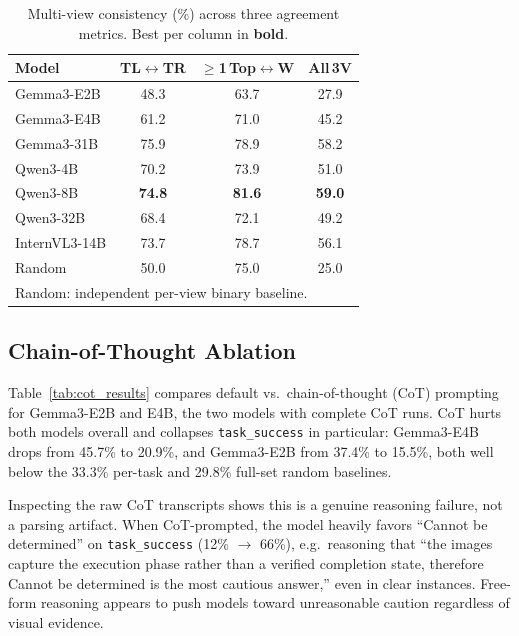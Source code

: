 \begin{table}[t]
  \centering
  \caption{Multi-view consistency (\%) across three agreement metrics. Best per column in
  \textbf{bold}.}
  \label{tab:multiview_results}
  \setlength{\tabcolsep}{4pt}
  \begin{tabular}{l|ccc}
    \toprule
    \textbf{Model} & \textbf{TL$\leftrightarrow$TR} & \textbf{$\geq$1\,Top$\leftrightarrow$W} & \textbf{All\,3V} \\
    \midrule
    Gemma3-E2B    & 48.3          & 63.7          & 27.9 \\
    Gemma3-E4B    & 61.2          & 71.0          & 45.2 \\
    Gemma3-31B    & 75.9          & 78.9          & 58.2 \\
    \midrule
    Qwen3-4B      & 70.2          & 73.9          & 51.0 \\
    Qwen3-8B      & \textbf{74.8} & \textbf{81.6} & \textbf{59.0} \\
    Qwen3-32B     & 68.4          & 72.1          & 49.2 \\
    \midrule
    InternVL3-14B & 73.7          & 78.7          & 56.1 \\
    \midrule
    Random        & 50.0          & 75.0          & 25.0 \\
    \bottomrule
    \multicolumn{4}{l}{\scriptsize Random: independent per-view binary baseline.} \\
  \end{tabular}
\end{table}

\subsection{Chain-of-Thought Ablation}
Table~\ref{tab:cot_results} compares default vs.\ chain-of-thought (CoT) prompting for Gemma3-E2B and E4B, the two models with complete CoT runs. CoT hurts both models overall and collapses \texttt{task\_success} in particular: Gemma3-E4B drops from 45.7\% to 20.9\%, and
Gemma3-E2B from 37.4\% to 15.5\%, both well below the 33.3\% per-task and 29.8\%
full-set random baselines.

Inspecting the raw CoT transcripts shows this is a genuine reasoning failure, not a parsing artifact. When CoT-prompted, the model heavily favors ``Cannot be determined'' on \texttt{task\_success} (12\% $\rightarrow$ 66\%), e.g.\ reasoning that ``the images capture the execution phase rather than a verified completion state,
therefore Cannot be determined is the most cautious answer,'' even in clear instances. Free-form reasoning appears to push models toward unreasonable caution regardless of visual evidence.


